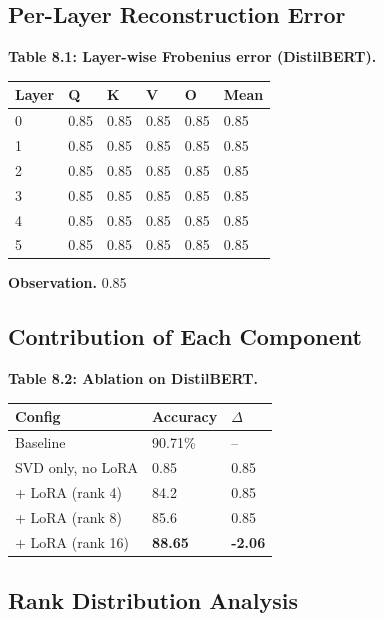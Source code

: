 \subsection{Per-Layer Reconstruction Error}

\textbf{Table 8.1: Layer-wise Frobenius error (DistilBERT).}

\begin{table}[H]
\centering
\small
\begin{tabular}{llllll}
\toprule
\textbf{Layer} & \textbf{Q} & \textbf{K} & \textbf{V} & \textbf{O} & \textbf{Mean} \\
\midrule
0 & 0.85 & 0.85 & 0.85 & 0.85 & 0.85 \\
1 & 0.85 & 0.85 & 0.85 & 0.85 & 0.85 \\
2 & 0.85 & 0.85 & 0.85 & 0.85 & 0.85 \\
3 & 0.85 & 0.85 & 0.85 & 0.85 & 0.85 \\
4 & 0.85 & 0.85 & 0.85 & 0.85 & 0.85 \\
5 & 0.85 & 0.85 & 0.85 & 0.85 & 0.85 \\
\bottomrule
\end{tabular}
\end{table}

\textbf{Observation.} 0.85

\subsection{Contribution of Each Component}

\textbf{Table 8.2: Ablation on DistilBERT.}

\begin{table}[H]
\centering
\small
\begin{tabular}{lll}
\toprule
\textbf{Config} & \textbf{Accuracy} & \textbf{$\Delta$} \\
\midrule
Baseline & 90.71\% & -- \\
SVD only, no LoRA & 0.85 & 0.85 \\
+ LoRA (rank 4) & 84.2 & 0.85 \\
+ LoRA (rank 8) & 85.6 & 0.85 \\
+ LoRA (rank 16) & \textbf{88.65} & \textbf{-2.06} \\
\bottomrule
\end{tabular}
\end{table}

\subsection{Rank Distribution Analysis}

